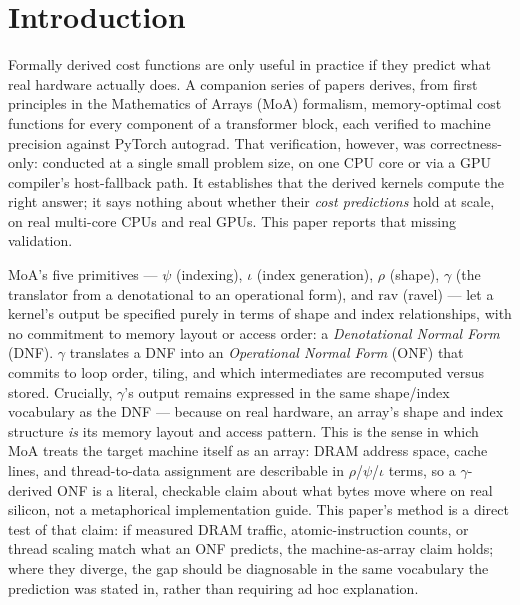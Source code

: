\documentclass[sigconf,review,anonymous]{acmart}
\begin{document}
\maketitle

\section{Introduction}

Formally derived cost functions are only useful in practice if they
predict what real hardware actually does. A companion series of papers
derives, from first principles in the Mathematics of Arrays (MoA)
formalism, memory-optimal cost functions for every component of a
transformer block, each verified to machine precision against PyTorch
autograd. That verification, however, was correctness-only: conducted
at a single small problem size, on one CPU core or via a GPU compiler's
host-fallback path. It establishes that the derived kernels compute the
right answer; it says nothing about whether their \emph{cost
predictions} hold at scale, on real multi-core CPUs and real GPUs. This
paper reports that missing validation.

MoA's five primitives --- $\psi$ (indexing), $\iota$ (index
generation), $\rho$ (shape), $\gamma$ (the translator from a
denotational to an operational form), and $\mathrm{rav}$ (ravel) ---
let a kernel's output be specified purely in terms of shape and index
relationships, with no commitment to memory layout or access order: a
\emph{Denotational Normal Form} (DNF). $\gamma$ translates a DNF into
an \emph{Operational Normal Form} (ONF) that commits to loop order,
tiling, and which intermediates are recomputed versus stored.
Crucially, $\gamma$'s output remains expressed in the same
shape/index vocabulary as the DNF --- because on real hardware, an
array's shape and index structure \emph{is} its memory layout and
access pattern. This is the sense in which MoA treats the target
machine itself as an array: DRAM address space, cache lines, and
thread-to-data assignment are describable in $\rho$/$\psi$/$\iota$
terms, so a $\gamma$-derived ONF is a literal, checkable claim about
what bytes move where on real silicon, not a metaphorical
implementation guide. This paper's method is a direct test of that
claim: if measured DRAM traffic, atomic-instruction counts, or thread
scaling match what an ONF predicts, the machine-as-array claim holds;
where they diverge, the gap should be diagnosable in the same
vocabulary the prediction was stated in, rather than requiring ad hoc
explanation.
\end{document}
